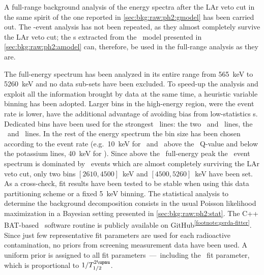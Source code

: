 A full-range background analysis of the energy spectra after the LAr veto cut in the same
spirit of the one reported in \cref{sec:bkg:raw:ph2:gmodel} has been carried out. The
\a-event analysis has not been repeated, as they almost completely survive the LAr veto
cut; the \pdf{}s extracted from the \a\ model presented in \cref{sec:bkg:raw:ph2:amodel} can,
therefore, be used in the full-range analysis as they are.

The full-energy spectrum has been analyzed in its entire range from 565~keV to 5260~keV
and no data sub-sets have been excluded. To speed-up the analysis and exploit all the
information brought by data at the same time, a heuristic variable binning has been
adopted. Larger bins in the high-energy region, were the event rate is lower, have the
additional advantage of avoiding bias from low-statistics \pdf{}s. Dedicated bins have
been used for the strongest \g\ lines: the two \kvn\ and \kvz\ lines, the \Bih\ and \Tl\
lines. In the rest of the energy spectrum the bin size has been chosen according to the
event rate (e.g.~10~keV for \enrBEGeII\ and \enrCoaxII\ above the \Arl\ Q-value and below
the potassium lines, 40~keV for \enrGeII). Since above the \Tl\ full-energy peak the
\Mone\ event spectrum is dominated by \a\ events which are almost completely surviving the
LAr veto cut, only two bins $[2610, 4500]$~keV and $[4500, 5260]$~keV have been set. As a
cross-check, fit results have been tested to be stable when using this data partitioning
scheme or a fixed 5~keV binning.
\newpar
The statistical analysis to determine the background decomposition consists in the usual
Poisson likelihood maximization in a Bayesian setting presented in
\cref{sec:bkg:raw:ph2:stat}. The C++ BAT-based~\cite{Caldwell2008} software routine is
publicly available on GitHub\textsuperscript{\ref{footnote:gerda-fitter}}. Since just few
representative fit parameters are used for each radioactive contamination, no priors from
screening measurement data have been used. A uniform prior is assigned to all fit
parameters~---~including the \nnbb\ fit parameter, which is proportional to $1/\thalftwoM$.

